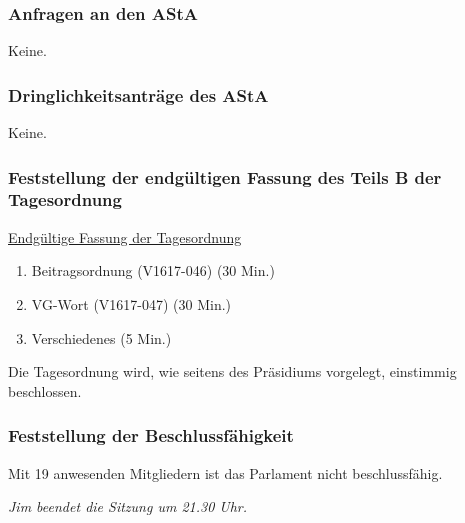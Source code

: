 \documentclass[ngerman,headheight=70pt]{scrartcl}
\begin{document}
    \subsubsection{Anfragen an den AStA}

    Keine.

    \subsubsection{Dringlichkeitsanträge des AStA}

    Keine.

    \subsubsection{Feststellung der endgültigen Fassung des Teils B der Tagesordnung}


    \underline{Endgültige Fassung der Tagesordnung}
    \begin{enumerate}[label={\textbf{Top \theenumi}},leftmargin=*]
        \item Beitragsordnung (V1617-046) (30 Min.)
        \item VG-Wort (V1617-047) (30 Min.)
        \item Verschiedenes (5 Min.)
    \end{enumerate}

    Die Tagesordnung wird, wie seitens des Präsidiums vorgelegt, einstimmig
    beschlossen.

    \subsubsection{Feststellung der Beschlussfähigkeit}

    Mit 19 anwesenden Mitgliedern ist das Parlament nicht beschlussfähig.

    \textit{Jim beendet die Sitzung um 21.30 Uhr.}
\end{document}
